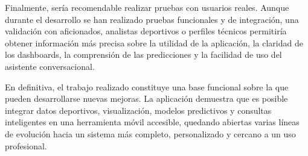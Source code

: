 Finalmente, sería recomendable realizar pruebas con usuarios reales. Aunque durante el desarrollo se han realizado pruebas funcionales y de integración, una validación con aficionados, analistas deportivos o perfiles técnicos permitiría obtener información más precisa sobre la utilidad de la aplicación, la claridad de los dashboards, la comprensión de las predicciones y la facilidad de uso del asistente conversacional.

En definitiva, el trabajo realizado constituye una base funcional sobre la que pueden desarrollarse nuevas mejoras. La aplicación demuestra que es posible integrar datos deportivos, visualización, modelos predictivos y consultas inteligentes en una herramienta móvil accesible, quedando abiertas varias líneas de evolución hacia un sistema más completo, personalizado y cercano a un uso profesional.